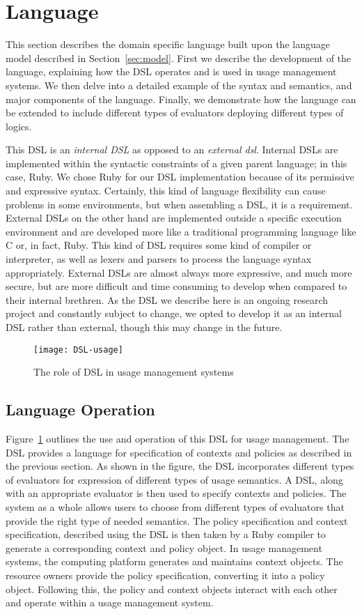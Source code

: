 \section{Language}\label{sec:language}
This section describes the domain specific language built upon the language model described in Section~\ref{sec:model}. First we describe the development of the language, explaining how the DSL operates and is used in usage management systems. We then delve into a detailed example of the syntax and semantics, and major components of the language. Finally, we demonstrate how the language can be extended to include different types of evaluators deploying different types of logics.

This DSL is an {\em internal DSL} as opposed to an {\em external dsl}.  Internal DSLs are implemented within the syntactic constraints of a given parent language; in this case, Ruby.  We chose Ruby for our DSL implementation because of its permissive and expressive syntax.  Certainly, this kind of language flexibility can cause problems in some environments, but when assembling a DSL, it is a requirement.  External DSLs on the other hand are implemented outside a specific execution environment and are developed more like a traditional programming language like C or, in fact, Ruby. This kind of DSL requires some kind of compiler or interpreter, as well as lexers and parsers to process the language syntax appropriately.  External DSLs are almost always more expressive, and much more secure, but are more difficult and time consuming to develop when compared to their internal brethren.  As the DSL we describe here is an ongoing research project and constantly subject to change, we opted to develop it as an internal DSL rather than external, though this may change in the future.

\begin{figure}[!t]
\centering
\texttt{[image: DSL-usage]}
\caption{The role of DSL in usage management systems}
\label{fig:DSL-usage}
\end{figure}

\subsection{Language Operation}
Figure~\ref{fig:DSL-usage} outlines the use and operation of this DSL for usage management. The DSL provides a language for specification of contexts and policies as described in the previous section. As shown in the figure, the DSL incorporates different types of evaluators for expression of different types of usage semantics. A DSL, along with an appropriate evaluator is then used to specify contexts and policies. The system as a whole allows users to choose from different types of evaluators that provide the right type of needed semantics. The policy specification and context specification, described using the DSL is then taken by a Ruby compiler to generate a corresponding context and policy object. In usage management systems, the computing platform generates and maintains context objects. The resource owners provide the policy specification, converting it into a policy object.  Following this, the policy and context objects interact with each other and operate within a usage management system.  

